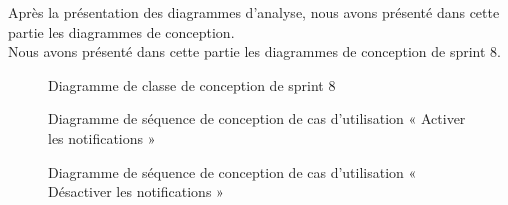 Après la présentation des diagrammes d'analyse, nous avons présenté dans cette partie les diagrammes de conception.\\ 
Nous avons présenté dans cette partie les diagrammes de conception de sprint 8. \\
\begin{landscape}


\begin{figure}[H]
  \centering
  \caption{Diagramme de classe de conception de sprint 8}
  \label{fig:class_diagram_8}
\end{figure}
\end{landscape}

\begin{figure}[H]
  \centering
  \caption{Diagramme de séquence de conception de cas d'utilisation « Activer les notifications »}
  \label{fig:sequence_conception_activate_notification}
\end{figure}

\begin{figure}[H]
  \centering
  \caption{Diagramme de séquence de conception de cas d'utilisation « Désactiver les notifications »}
  \label{fig:sequence_conception_deactivate_notification}
\end{figure}

